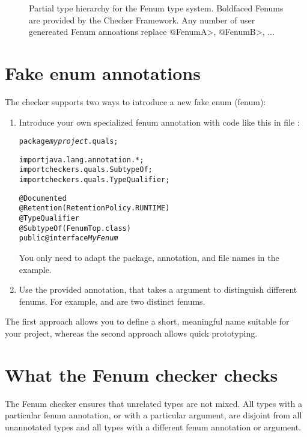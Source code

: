 \begin{figure}
\caption{Partial type hierarchy for the Fenum type system.
Boldfaced Fenums are provided by the Checker Framework. Any
number of user genereated Fenum annoations replace \<@FenumA>, \<@FenumB>, ...}
\label{fig:fenum-hierarchy}
\end{figure}

\section{Fake enum annotations\label{fenum-annotations}}

The checker supports two ways to introduce a new fake enum (fenum):

\begin{enumerate}
\item Introduce your own specialized fenum annotation with code like this in
file :

\begin{alltt}
package \textit{myproject}.quals;

import java.lang.annotation.*;
import checkers.quals.SubtypeOf;
import checkers.quals.TypeQualifier;

@Documented
@Retention(RetentionPolicy.RUNTIME)
@TypeQualifier
@SubtypeOf( \ttlcb{} FenumTop.class \ttrcb{} )
public @interface \textit{MyFenum} \ttlcb\ttrcb
\end{alltt}

You only need to adapt the package, annotation, and file names in the example.


\item Use the provided  annotation, that takes a
 argument to distinguish different fenums.
For example,  and  are two distinct fenums.
\end{enumerate}


The first approach allows you to define a short, meaningful name suitable for
your project, whereas the second approach allows quick prototyping.



\section{What the Fenum checker checks\label{fenum-checks}}

The Fenum checker ensures that unrelated types are not mixed. 
All types with a particular fenum annotation, or  with a particular  argument, are
disjoint from all unannotated types and all types with a different fenum
annotation or  argument.

